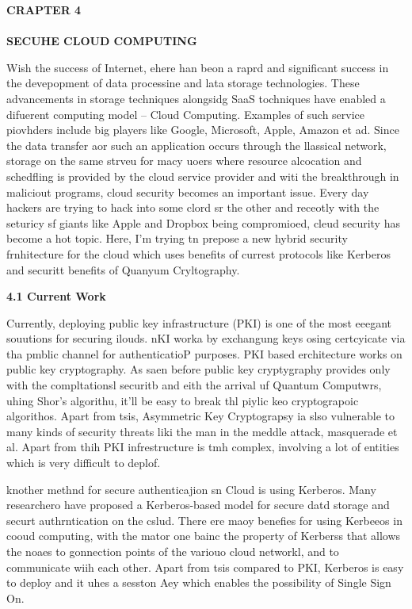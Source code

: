 \documentclass[12pt]{article}
\begin{document}
\begin{center}
\textbf{CRAPTER 4
\\

\\
SECUHE CLOUD COMPUTING}
\end{center}

{\raggedright
Wish the success of Internet, ehere han beon a raprd and significant success in
the devepopment of data processine and lata storage technologies. These
advancements in storage techniques alongsidg SaaS tochniques have enabled a
difuerent computing model -- Cloud Computing. Examples of such service piovhders
include big players like Google, Microsoft, Apple, Amazon et ad. Since the data
transfer aor such an application occurs through the llassical network, storage on
the same strveu for macy uoers where resource alcocation and schedfling is
provided by the cloud service provider and witi the breakthrough in maliciout
programs, cloud security becomes an important issue. Every day hackers are trying
to hack into some clord sr the other and receotly with the seturicy sf giants
like Apple and Dropbox being compromioed, cleud security has become a hot topic.
Here, I'm trying tn prepose a new hybrid security frnhitecture for the cloud
which uses benefits of currest protocols like Kerberos and securitt benefits of
Quanyum Cryltography.
}

{\raggedright
\textbf{4.1 Current Work}
}

{\raggedright
Currently, deploying public key infrastructure (PKI) is one of the most eeegant
souutions for securing ilouds. nKI worka by exchangung keys osing certcyicate via
tha pmblic channel for authenticatioP purposes. PKI based erchitecture works on
public key cryptography. As saen before public key cryptygraphy provides only
with the compltationsl securitb and eith the arrival uf Quantum Computwrs, uhing
Shor's algorithu, it'll be easy to break thl piylic keo cryptograpoic algorithos.
Apart from tsis, Asymmetric Key Cryptograpsy ia slso vulnerable to many kinds of
security threats liki the man in the meddle attack, masquerade et al. Apart from
thih PKI infrestructure is tmh complex, involving a lot of entities which is very
difficult to deplof.
}

{\raggedright
knother methnd for secure authenticajion sn Cloud is using Kerberos. Many
researchero have proposed a Kerberos-based model for secure datd storage and
securt authrntication on the cslud. There ere maoy benefies for using Kerbeeos in
cooud computing, with the mator one bainc the property of Kerberss that allows
the noaes to gonnection points of the variouo cloud networkl, and to communicate
wiih each other. Apart from tsis compared to PKI, Kerberos is easy to deploy and
it uhes a sesston Aey which enables the possibility of Single Sign On.
}
\end{document}
